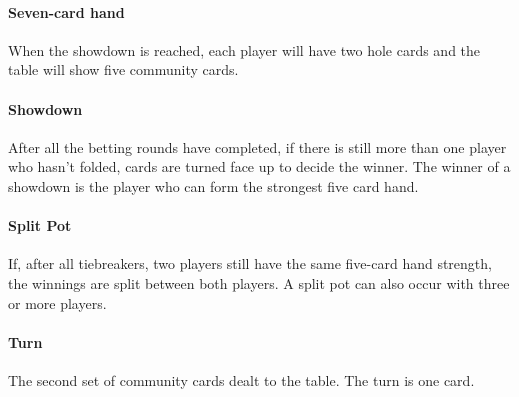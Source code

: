 \begin{flushleft}
\paragraph*{Seven-card hand} When the showdown is reached, each player will have two hole cards and the table will show five community cards.

\paragraph*{Showdown} After all the betting rounds have completed, if there is still more than one player who hasn't folded, cards are turned face up to decide the winner. The winner of a showdown is the player who can form the strongest five card hand.

\paragraph*{Split Pot} If, after all tiebreakers, two players still have the same five-card hand strength, the winnings are split between both players. A split pot can also occur with three or more players.

\paragraph*{Turn} The second set of community cards dealt to the table. The turn is one card.





\end{flushleft}



\begin{flushleft}



\end{flushleft}
\clearpage

